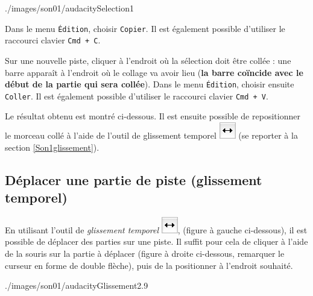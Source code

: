                 {./images/son01/audacitySelection1}{\textwidth}


Dans le menu \texttt{Édition}, choisir \texttt{Copier}. Il est également possible d'utiliser le raccourci clavier \texttt{Cmd + C}.   


Sur une nouvelle piste, cliquer à l'endroit où la sélection doit être collée : une barre apparaît à l'endroit où le collage va avoir lieu (\textbf{la barre coïncide avec le début de la partie qui sera collée}). Dans le menu \texttt{Édition}, choisir ensuite \texttt{Coller}. Il est également possible d'utiliser le raccourci clavier \texttt{Cmd + V}.  


Le résultat obtenu est montré ci-dessous. Il est ensuite possible de repositionner le morceau collé à l'aide de l'outil de glissement temporel \includegraphics[width=.5cm]{./images/son01/audacityIconeGlissement} (se reporter à la section \vref{Son1glissement}). 



\subsection{Déplacer une partie de piste (glissement temporel)}\label{Son1glissement} 

En utilisant l'outil de \emph{glissement temporel} \includegraphics[width=.5cm]{./images/son01/audacityIconeGlissement}, (figure à gauche ci-dessous), il est possible de déplacer des parties sur une piste. Il suffit pour cela de cliquer à l'aide de la souris sur la partie à déplacer (figure à droite ci-dessous, remarquer le curseur en forme de double flèche), puis de la positionner à l'endroit souhaité.

%
                {./images/son01/audacityGlissement2}{.9\textwidth}




